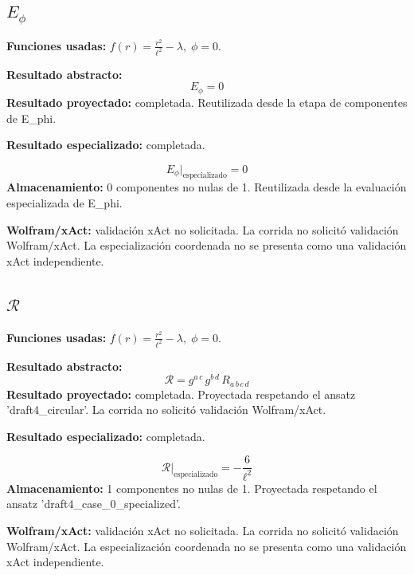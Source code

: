\documentclass[11pt]{article}
\begin{document}
\subsection*{$ E_{\phi} $}
\textbf{Funciones usadas:} $ f\!\left(r\right) = \frac{{r}^{2}}{{\ell}^{2}} - \lambda,\;\phi=0 $.\par
\textbf{Resultado abstracto:}
\begin{dmath*}[breakdepth={5}]
E_{\phi} = 0
\end{dmath*}
\textbf{Resultado proyectado:} completada. Reutilizada desde la etapa de componentes de E\_phi.\par
\textbf{Resultado especializado:} completada.\par
\begin{dmath*}[breakdepth={5}]
E_{\phi}\big|_{\mathrm{especializado}} = 0
\end{dmath*}
\textbf{Almacenamiento:} 0 componentes no nulas de 1. Reutilizada desde la evaluación especializada de E\_phi.\par
\textbf{Wolfram/xAct:} validación xAct no solicitada. La corrida no solicitó validación Wolfram/xAct. La especialización coordenada no se presenta como una validación xAct independiente.\par\medskip
{}
\subsection*{$ \mathcal{R} $}
\textbf{Funciones usadas:} $ f\!\left(r\right) = \frac{{r}^{2}}{{\ell}^{2}} - \lambda,\;\phi=0 $.\par
\textbf{Resultado abstracto:}
\begin{dmath*}[breakdepth={5}]
\mathcal{R} = g{}^{a\,c}\,g{}^{b\,d}\,R{}_{a\,b\,c\,d}
\end{dmath*}
\textbf{Resultado proyectado:} completada. Proyectada respetando el ansatz 'draft4\_circular'. La corrida no solicitó validación Wolfram/xAct.\par
\textbf{Resultado especializado:} completada.\par
\begin{dmath*}[breakdepth={5}]
\mathcal{R}\big|_{\mathrm{especializado}} = -\frac{6}{{\ell}^{2}}
\end{dmath*}
\textbf{Almacenamiento:} 1 componentes no nulas de 1. Proyectada respetando el ansatz 'draft4\_case\_0\_specialized'.\par
\textbf{Wolfram/xAct:} validación xAct no solicitada. La corrida no solicitó validación Wolfram/xAct. La especialización coordenada no se presenta como una validación xAct independiente.\par\medskip
{}
\end{document}
